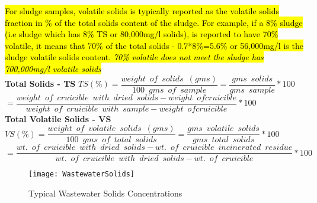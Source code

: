 				\hl{For sludge samples, volatile solids is typically reported as the volatile solids fraction in \% of the total solids content of the sludge.  For example, if a 8\% sludge (i.e sludge which has 8\% TS or 80,000mg/l solids), is reported to have 70\% volatile, it means that 70\% of the total solids - 0.7*8\%=5.6\% or 56,000mg/l is the sludge volatile solids content.  \emph{70\% volatile does not meet the sludge has 700,000mg/l volatile solids}}\\	

\vspace{0.4cm}
\textbf{Total Solids - TS}			
\vspace{0.4cm}
$TS(\%)=\dfrac{weight \enspace of \enspace solids \enspace (gms)}{100 \enspace gms \enspace of \enspace sample}=\dfrac{gms \enspace solids}{gms \enspace sample}*100$\\
\vspace{0.3cm}
\hspace{1.2cm}$=\dfrac{weight \enspace of \enspace cruicible \enspace with \enspace dried  \enspace solids - weight \enspace of cruicible}{weight \enspace of \enspace cruicible \enspace with \enspace sample - weight \enspace of cruicible}*100$\\
\vspace{0.4cm}
\textbf{Total Volatile Solids - VS}		
\vspace{0.4cm}
$VS(\%)=\dfrac{weight \enspace of \enspace volatile \enspace solids \enspace (gms)}{100 \enspace gms \enspace of \enspace total \enspace solids}=\dfrac{gms \enspace volatile \enspace solids}{gms \enspace total \enspace solids}*100$\\
\vspace{0.3cm}
\hspace{1.2cm}$=\dfrac{wt. \enspace of \enspace cruicible  \enspace with \enspace dried  \enspace solids - wt. \enspace of \enspace cruicible \enspace incinerated \enspace residue}{wt. \enspace of \enspace cruicible  \enspace with \enspace dried  \enspace solids - wt. \enspace of \enspace cruicible}*100$\\
				\newpage
				\thispagestyle{empty}
				\begin{sidewaysfigure}
					\begin{center}
						\texttt{[image: WastewaterSolids]}\\
						\caption{Typical Wastewater Solids Concentrations}
					\end{center}
				\end{sidewaysfigure}
\newpage
\thispagestyle{empty}


